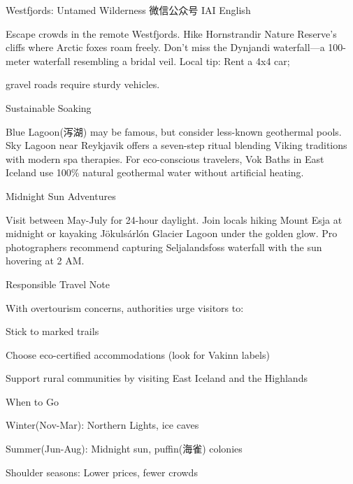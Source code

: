 \documentclass{英语试卷}
\begin{document}
\par Westfjords: Untamed Wilderness 微信公众号 IAI English\par
\par Escape crowds in the remote Westfjords. Hike Hornstrandir Nature Reserve's cliffs where Arctic foxes roam freely. Don't miss the Dynjandi waterfall—a 100-meter waterfall resembling a bridal veil. Local tip: Rent a 4x4 car;\par
\par gravel roads require sturdy vehicles.\par
\par Sustainable Soaking\par
\par Blue Lagoon(泻湖) may be famous, but consider less-known geothermal pools. Sky Lagoon near Reykjavik offers a seven-step ritual blending Viking traditions with modern spa therapies. For eco-conscious travelers, Vok Baths in East Iceland use 100\% natural geothermal water without artificial heating.\par
\par Midnight Sun Adventures\par
\par Visit between May-July for 24-hour daylight. Join locals hiking Mount Esja at midnight or kayaking Jökulsárlón Glacier Lagoon under the golden glow. Pro photographers recommend capturing Seljalandsfoss waterfall with the sun hovering at 2 AM.\par
\par Responsible Travel Note\par
\par With overtourism concerns, authorities urge visitors to:\par
\par Stick to marked trails\par
\par Choose eco-certified accommodations (look for Vakinn labels)\par
\par Support rural communities by visiting East Iceland and the Highlands\par
\par When to Go\par
\par Winter(Nov-Mar): Northern Lights, ice caves\par
\par Summer(Jun-Aug): Midnight sun, puffin(海雀) colonies\par
\par Shoulder seasons: Lower prices, fewer crowds\par
\end{document}
